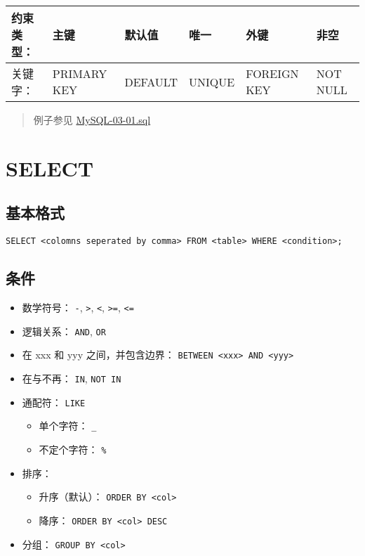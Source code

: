 \documentclass[a4paper, twoside]{article}
\newcommand{\tightlist}{%
  \setlength{\itemsep}{0pt}\setlength{\parskip}{0pt}}
\begin{document}
\begin{longtable}[c]{@{}llllll@{}}
\toprule
约束类型： & 主键 & 默认值 & 唯一 & 外键 & 非空\tabularnewline
\midrule
\endhead
关键字： & PRIMARY KEY & DEFAULT & UNIQUE & FOREIGN KEY & NOT
NULL\tabularnewline
\bottomrule
\end{longtable}

\begin{quote}
例子参见 \href{../cs9/SQL3/MySQL-03-01.sql}{MySQL-03-01.sql}
\end{quote}

\section{SELECT}

\subsection{基本格式}

\begin{verbatim}
SELECT <colomns seperated by comma> FROM <table> WHERE <condition>;
\end{verbatim}

\subsection{条件}

\begin{itemize}
\tightlist
\item
  数学符号： \texttt{-}, \texttt{\textgreater{}}, \texttt{\textless{}},
  \texttt{\textgreater{}=}, \texttt{\textless{}=}
\item
  逻辑关系： \texttt{AND}, \texttt{OR}
\item
  在 xxx 和 yyy 之间，并包含边界：
  \texttt{BETWEEN\ \textless{}xxx\textgreater{}\ AND\ \textless{}yyy\textgreater{}}
\item
  在与不再： \texttt{IN}, \texttt{NOT\ IN}
\item
  通配符： \texttt{LIKE}

  \begin{itemize}
  \tightlist
  \item
    单个字符： \texttt{\_}
  \item
    不定个字符： \texttt{\%}
  \end{itemize}
\item
  排序：

  \begin{itemize}
  \tightlist
  \item
    升序（默认）： \texttt{ORDER\ BY\ \textless{}col\textgreater{}}
  \item
    降序： \texttt{ORDER\ BY\ \textless{}col\textgreater{}\ DESC}
  \end{itemize}
\item
  分组： \texttt{GROUP\ BY\ \textless{}col\textgreater{}}
\end{itemize}
\end{document}
